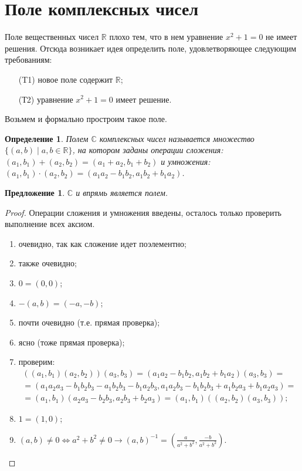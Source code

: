 \documentclass[a4paper,12pt]{article}
\newtheorem*{Def}{Определение}
\newtheorem*{Suggestion}{Предложение}
\begin{document}
\section*{Поле комплексных чисел}
Поле вещественных чисел $\mathbb{R}$ плохо тем, что в нем уравнение $x^2 + 1 = 0$ не имеет решения. Отсюда возникает идея определить поле, удовлетворяющее следующим требованиям:
\begin{itemize}
\item[(T1)] новое поле содержит $\mathbb{R}$;
\item[(Т2)] уравнение $x^2 +1 = 0$ имеет решение.
\end{itemize}
Возьмем и формально простроим такое поле.

\begin{Def}
Полем $\mathbb{C}$ комплексных чисел называется множество $\{(a, b) \mid a, b \in \mathbb{R}\}$, на котором заданы операции сложения: $(a_1, b_1) + (a_2, b_2) = (a_1 + a_2, b_1 + b_2)$ и умножения: $(a_1, b_1) \cdot (a_2, b_2) = (a_1a_2 - b_1b_2, a_1b_2 + b_1a_2)$.
\end{Def}

\begin{Suggestion}
$\mathbb{C}$ и впрямь является полем.
\end{Suggestion}

\begin{proof}
Операции сложения и умножения введены, осталось только проверить выполнение всех аксиом.
\begin{enumerate}
\item очевидно, так как сложение идет поэлементно;
\item также очевидно;
\item $0 = (0, 0)$;
\item $-(a, b) = (-a, -b)$;
\item почти очевидно (т.е. прямая проверка);
\item ясно (тоже прямая проверка);
\item проверим:
\begin{gather*}
((a_1, b_1) (a_2, b_2)) (a_3, b_3) = (a_1a_2 - b_1b_2, a_1b_2 + b_1a_2) (a_3, b_3) = \\ 
= (a_1a_2a_3 - b_1b_2b_3 - a_1b_2b_3 - b_1a_2b_3, a_1a_2b_3 - b_1b_2b_3 + a_1b_2a_3 + b_1a_2a_3) = \\
= (a_1, b_1)  (a_2a_3 - b_2b_3, a_2b_3 + b_2a_3) = (a_1, b_1)((a_2, b_2) (a_3, b_3));
\end{gather*}
\item $1 = (1, 0)$;
\item $(a, b) \neq 0 \Leftrightarrow a^2 + b^2 \neq 0 \rightarrow (a, b)^{-1} = \left(\frac{a}{a^2 + b^2}, \frac{-b}{a^2 + b^2}\right)$.
\end{enumerate}
\end{proof}
\end{document}
